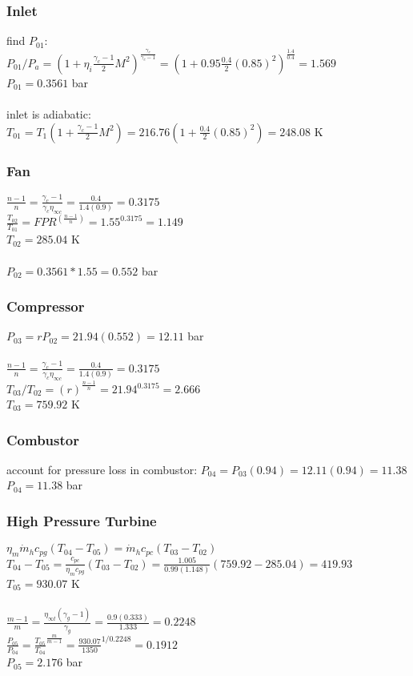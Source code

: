\documentclass{article}
\begin{document}
\subsubsection*{Inlet}
find $P_{01}$: \\
$P_{01}/P_a=(1+\eta_i\frac{\gamma_c-1}{2}M^2)^\frac{\gamma_c}{\gamma_c-1}=
(1+0.95\frac{0.4}{2}(0.85)^2)^\frac{1.4}{0.4}=1.569$ \\
$P_{01}=0.3561$ bar \\\\
inlet is adiabatic: \\
$T_{01}=T_1(1+\frac{\gamma_c-1}{2}M^2)=216.76(1+\frac{0.4}{2}(0.85)^2)=248.08$ K

\subsubsection*{Fan}
$\frac{n-1}{n}=\frac{\gamma_c-1}{\gamma_c\eta_{\infty c}}=\frac{0.4}{1.4(0.9)}=0.3175$ \\
$\frac{T_{02}}{T_{01}}=FPR^{(\frac{n-1}{n})}=1.55^{0.3175}=1.149$ \\
$T_{02}=285.04$ K \\\\
$P_{02}=0.3561*1.55=0.552$ bar

\subsubsection*{Compressor}
$P_{03}=rP_{02}=21.94(0.552)=12.11$ bar \\\\
$\frac{n-1}{n}=\frac{\gamma_c-1}{\gamma_c \eta_{\infty c}}=\frac{0.4}{1.4(0.9)}=
0.3175$ \\
$T_{03}/T_{02}=(r)^\frac{n-1}{n}=21.94^{0.3175}=2.666$ \\
$T_{03}=759.92$ K

\subsubsection*{Combustor}
account for pressure loss in combustor: $P_{04}=P_{03}(0.94)=12.11(0.94)=11.38$ \\
$P_{04}=11.38$ bar

\subsubsection*{High Pressure Turbine}
$\eta_m \dot{m}_h c_{pg}(T_{04}-T_{05})=\dot{m}_h c_{pc}(T_{03}-T_{02})$ \\
$T_{04}-T_{05}=\frac{c_{pc}}{\eta_m c_{pg}}(T_{03}-T_{02})=\frac{1.005}{0.99(1.148)}
(759.92-285.04)=419.93$ \\
$T_{05}=930.07$ K \\\\
$\frac{m-1}{m}=\frac{\eta_{\infty t}(\gamma_g-1)}{\gamma_g}=\frac{0.9(0.333)}{1.333}=
0.2248$ \\
$\frac{P_{05}}{P_{04}}=\frac{T_{05}}{T_{04}}^\frac{m}{m-1}=\frac{930.07}{1350}^{1/0.2248}
=0.1912$ \\
$P_{05}=2.176$ bar
\end{document}
